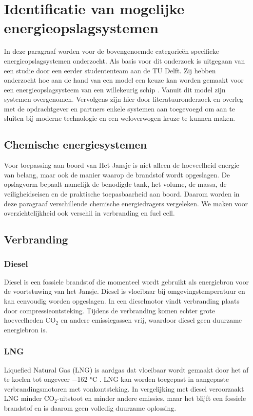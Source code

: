 \section{Identificatie van mogelijke energieopslagsystemen}
In deze paragraaf worden voor de bovengenoemde categorieën specifieke energieopslagsystemen onderzocht. Als basis voor dit onderzoek is uitgegaan van een studie door een eerder studententeam aan de TU Delft. Zij hebben onderzocht hoe aan de hand van een model een keuze kan worden gemaakt voor een energieopslagsysteem van een willekeurig schip \cite{BEPmodelexcel}. Vanuit dit model zijn systemen overgenomen. Vervolgens zijn hier door literatuuronderzoek en overleg met de opdrachtgever en partners enkele systemen aan toegevoegd om aan te sluiten bij moderne technologie en een weloverwogen keuze te kunnen maken.

\subsection{Chemische energiesystemen}
Voor toepassing aan boord van Het Jansje is niet alleen de hoeveelheid energie
van belang, maar ook de manier waarop de brandstof wordt opgeslagen. De
opslagvorm bepaalt namelijk de benodigde tank, het volume, de massa, de
veiligheidseisen en de praktische toepasbaarheid aan boord. Daarom worden in
deze paragraaf verschillende chemische energiedragers vergeleken. We maken voor overzichtelijkheid ook verschil in verbranding en fuel cell.

\subsection*{Verbranding}

\subsubsection{\textbf{Diesel}}
Diesel is een fossiele brandstof die momenteel wordt gebruikt als energiebron voor de voortstuwing van het Jansje. Diesel is vloeibaar bij omgevingstemperatuur en kan eenvoudig worden opgeslagen. In een dieselmotor vindt verbranding plaats door compressieontsteking. Tijdens de verbranding komen echter grote hoeveelheden CO$_2$ en andere emissiegassen vrij, waardoor diesel geen duurzame energiebron is.

\subsubsection{\textbf{LNG}}
Liquefied Natural Gas (LNG) is aardgas dat vloeibaar wordt gemaakt door het af te koelen tot ongeveer −162 °C \cite{LiquefiedNaturalGasBook}. LNG kan worden toegepast in aangepaste verbrandingsmotoren met vonkontsteking. In vergelijking met diesel veroorzaakt LNG minder CO$_2$-uitstoot en minder andere emissies, maar het blijft een fossiele brandstof en is daarom geen volledig duurzame oplossing.

